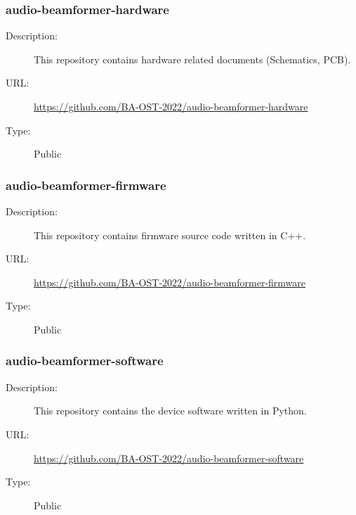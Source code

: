 \subsubsection{audio-beamformer-hardware} \vspace{-0.2cm}
\begin{description}
	\item[Description:] This repository contains hardware related documents (Schematics, PCB).\vspace{-0.25cm}
	\item[URL:] \url{https://github.com/BA-OST-2022/audio-beamformer-hardware}\vspace{-0.25cm}
	\item[Type:] Public\vspace{-0.25cm}
\end{description}

\subsubsection{audio-beamformer-firmware} \vspace{-0.2cm}
\begin{description}
	\item[Description:] This repository contains firmware source code written in C++.\vspace{-0.25cm}
	\item[URL:] \url{https://github.com/BA-OST-2022/audio-beamformer-firmware}\vspace{-0.25cm}
	\item[Type:] Public\vspace{-0.25cm}
\end{description}

\subsubsection{audio-beamformer-software} \vspace{-0.2cm}
\begin{description}
	\item[Description:] This repository contains the device software written in Python.\vspace{-0.25cm}
	\item[URL:] \url{https://github.com/BA-OST-2022/audio-beamformer-software}\vspace{-0.25cm}
	\item[Type:] Public\vspace{-0.25cm}
\end{description}

